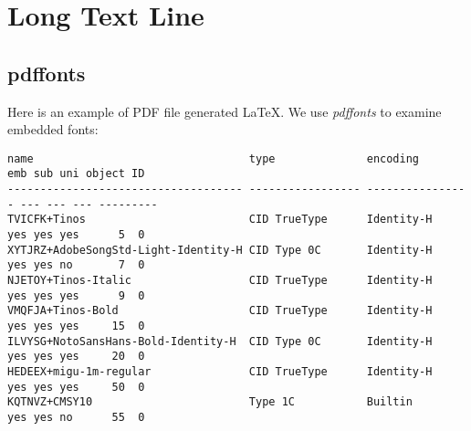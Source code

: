 \appendix

\chapter{Long Text Line}
\label{cha:long-text-lines}

\section{pdffonts}
\label{sec:pdffonts}

Here is an example of PDF file generated \LaTeX{}. We use
\textit{pdffonts} to examine embedded fonts:
  
\begin{landscape}
\begin{lstlisting}[language={},caption={\LaTeX{} 内嵌字体},frame={tb},label={pdffonts}]
name                                 type              encoding         emb sub uni object ID
------------------------------------ ----------------- ---------------- --- --- --- ---------
TVICFK+Tinos                         CID TrueType      Identity-H       yes yes yes      5  0
XYTJRZ+AdobeSongStd-Light-Identity-H CID Type 0C       Identity-H       yes yes no       7  0
NJETOY+Tinos-Italic                  CID TrueType      Identity-H       yes yes yes      9  0
VMQFJA+Tinos-Bold                    CID TrueType      Identity-H       yes yes yes     15  0
ILVYSG+NotoSansHans-Bold-Identity-H  CID Type 0C       Identity-H       yes yes yes     20  0
HEDEEX+migu-1m-regular               CID TrueType      Identity-H       yes yes yes     50  0
KQTNVZ+CMSY10                        Type 1C           Builtin          yes yes no      55  0
\end{lstlisting}  
\end{landscape}

